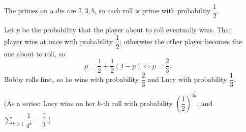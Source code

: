 The primes on a die are $2,3,5$, so each roll is prime with probability $\dfrac{1}{2}$.

Let $p$ be the probability that the player about to roll eventually wins. That player wins at once with probability $\dfrac{1}{2}$; otherwise the other player becomes the one about to roll, so
\[
p=\dfrac{1}{2}+\dfrac{1}{2}(1-p)\iff p=\dfrac{2}{3} .
\]
Bobby rolls first, so he wins with probability $\dfrac{2}{3}$ and Lucy with probability $\boxed{\dfrac{1}{3}}$.

(As a series: Lucy wins on her $k$-th roll with probability $\left(\dfrac{1}{2}\right)^{2k}$, and $\displaystyle\sum_{k\ge1}\dfrac{1}{4^k}=\dfrac{1}{3}$.)
